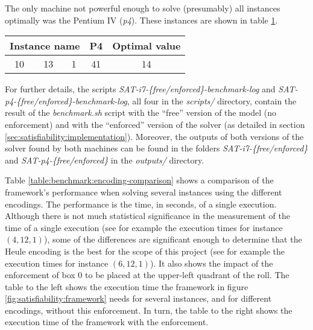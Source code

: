 The only machine not powerful enough to solve (presumably) all instances optimally
was the Pentium IV (\textit{p4}). These instances are shown in table
\ref{table:benchmark:SAT-results:suboptimalinstances}.

\begin{table}[H]
\centering
	\begin{tabular}{ccccc}
		\multicolumn{3}{c}{Instance name}
					& P4		& Optimal value \\
		\midrule
		10 & 13 & 1	& 41		& 14 \\
	\end{tabular}
	\label{table:benchmark:SAT-results:suboptimalinstances}
\end{table}

For further details, the scripts \textit{SAT-i7-\{free/enforced\}-benchmark-log}
and \textit{SAT-p4-\{free/enforced\}-benchmark-log}, all four in the \textit{scripts/}
directory, contain the result of the \textit{benchmark.sh} script with the ``free''
version of the model (no enforcement) and with the ``enforced'' version of the solver
(as detailed in section \ref{sec:satisfiability:implementation}). Moreover, the
outputs of both versions of the solver found by both machines can be found in the
folders \textit{SAT-i7-\{free/enforced\}} and \textit{SAT-p4-\{free/enforced\}}
in the \textit{outputs/} directory.

\hfill

Table \ref{table:benchmark:encoding-comparison} shows a comparison of the framework's
performance when solving several instances using the different encodings. The performance
is the time, in seconds, of a single execution. Although there is not much statistical
significance in the measurement of the time of a single execution (see for example the
execution times for instance $(4,12,1)$), some of the differences
are significant enough to determine that the Heule encoding is the best for the scope
of this project (see for example the execution times for instance $(6,12,1)$).
It also shows the impact of the enforcement of box 0 to be
placed at the upper-left quadrant of the roll. The table to the left shows the execution time
the framework in figure \ref{fig:satisfiability:framework} needs for several instances,
and for different encodings, without this enforcement. In turn, the table to the right
shows the execution time of the framework with the enforcement.

